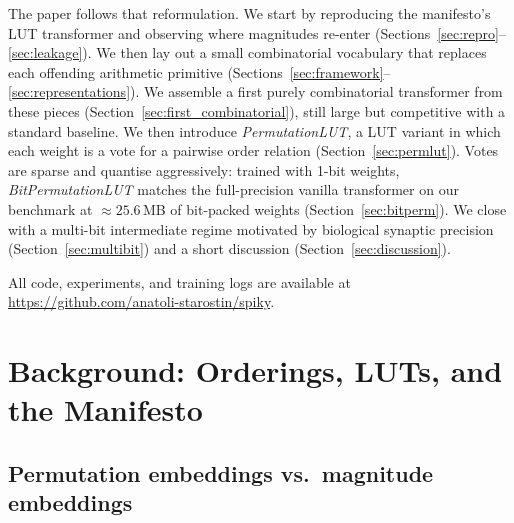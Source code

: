 \documentclass[11pt]{article}
\begin{document}
The paper follows that reformulation.
We start by reproducing the manifesto's LUT transformer and observing where magnitudes re-enter (Sections~\ref{sec:repro}--\ref{sec:leakage}).
We then lay out a small combinatorial vocabulary that replaces each offending arithmetic primitive (Sections~\ref{sec:framework}--\ref{sec:representations}).
We assemble a first purely combinatorial transformer from these pieces (Section~\ref{sec:first_combinatorial}), still large but competitive with a standard baseline.
We then introduce \emph{PermutationLUT}, a LUT variant in which each weight is a vote for a pairwise order relation (Section~\ref{sec:permlut}).
Votes are sparse and quantise aggressively: trained with 1-bit weights, \emph{BitPermutationLUT} matches the full-precision vanilla transformer on our benchmark at $\approx\!25.6$\,MB of bit-packed weights (Section~\ref{sec:bitperm}).
We close with a multi-bit intermediate regime motivated by biological synaptic precision (Section~\ref{sec:multibit}) and a short discussion (Section~\ref{sec:discussion}).

All code, experiments, and training logs are available at\\ \url{https://github.com/anatoli-starostin/spiky}.


\section{Background: Orderings, LUTs, and the Manifesto}
\label{sec:background}

\subsection{Permutation embeddings vs.\ magnitude embeddings}
\end{document}
